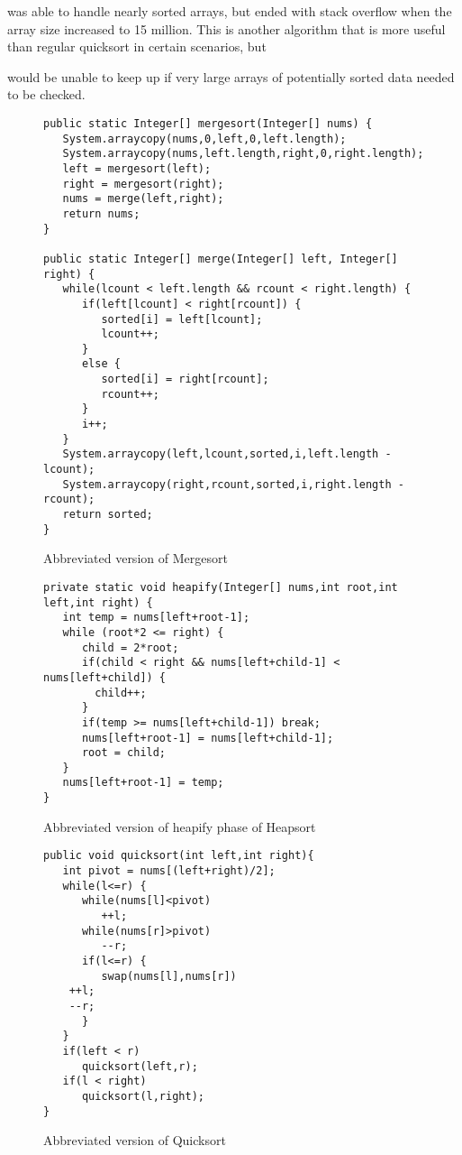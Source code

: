 \documentclass{article}
\begin{document}
was able to handle nearly sorted arrays, but ended with stack overflow when the array size increased to 
15 million. This is another algorithm that is more useful than regular quicksort in certain scenarios, but 

would be unable to keep up if very large arrays of potentially sorted data needed to be checked.
 
\begin{figure}
\begin{lstlisting}
public static Integer[] mergesort(Integer[] nums) { 
   System.arraycopy(nums,0,left,0,left.length);
   System.arraycopy(nums,left.length,right,0,right.length);
   left = mergesort(left);
   right = mergesort(right);
   nums = merge(left,right);
   return nums;
}

public static Integer[] merge(Integer[] left, Integer[] right) {
   while(lcount < left.length && rcount < right.length) {
      if(left[lcount] < right[rcount]) {
         sorted[i] = left[lcount];
         lcount++;
      }
      else {
         sorted[i] = right[rcount];
         rcount++;
      }
      i++;
   }
   System.arraycopy(left,lcount,sorted,i,left.length - lcount);
   System.arraycopy(right,rcount,sorted,i,right.length - rcount);
   return sorted;
}
\end{lstlisting}
\caption{Abbreviated version of Mergesort}
\label{code-mergesort}
\end{figure}

\begin{figure}
\begin{lstlisting}
private static void heapify(Integer[] nums,int root,int left,int right) {
   int temp = nums[left+root-1];
   while (root*2 <= right) {
      child = 2*root;
      if(child < right && nums[left+child-1] < nums[left+child]) {
        child++;
      }
      if(temp >= nums[left+child-1]) break;
      nums[left+root-1] = nums[left+child-1];
      root = child;
   }
   nums[left+root-1] = temp;
}
\end{lstlisting}
\caption{Abbreviated version of heapify phase of Heapsort}
\end{figure}

\begin{figure}
\begin{lstlisting}
public void quicksort(int left,int right){
   int pivot = nums[(left+right)/2];
   while(l<=r) {
      while(nums[l]<pivot)
         ++l;
      while(nums[r]>pivot)
         --r;
      if(l<=r) {
         swap(nums[l],nums[r])
	++l;
	--r;
      }
   }
   if(left < r)
      quicksort(left,r);
   if(l < right)
      quicksort(l,right);
}
\end{lstlisting}
\caption{Abbreviated version of Quicksort}
\end{figure}
\end{document}
